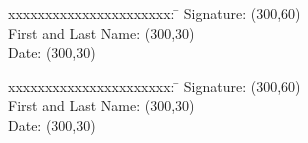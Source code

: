 { \Large \sigformconsult\par}
\begin{tabbing}
	xxxxxxxxxxxxxxxxxxxxxx:          \= \kill  %
	Signature:                       \> \framebox(300,60){}
	{\mbox{}} \\
	First and Last Name:             \> \framebox(300,30){}
	{\mbox{}} \\
	Date:                            \> \framebox(300,30){}
	{\mbox{}} \\
\end{tabbing}
{ \Large \sigformclient\par}
\begin{tabbing}
	xxxxxxxxxxxxxxxxxxxxxx:          \= \kill  %
	Signature:                       \> \framebox(300,60){}
	{\mbox{}} \\                                         
	First and Last Name:             \> \framebox(300,30){}
	{\mbox{}} \\                                         
	Date:                            \> \framebox(300,30){}
	{\mbox{}} \\
\end{tabbing}
